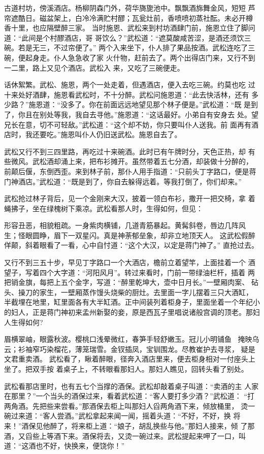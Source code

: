 古道村坊，傍溪酒店。杨柳阴森门外，荷华旖旎池中。飘飘酒旆舞金风，短短
芦帘遮酷日。磁盆架上，白冷冷满贮村醪；瓦瓮灶前，香喷喷初蒸社酝。未必开樽
香十里，也应隔壁醉三家。
当时施恩、武松来到村坊酒肆门前，施恩立住了脚问道：“此间是个村醪酒店，哥
哥饮么？”武松道：“遮莫酸咸苦涩，是酒还须饮三碗。若是无三，不过帘便了。”
两个入来坐下，仆人排了果品按酒。武松连吃了三碗，便起身走。仆人急急收了家
火什物，赶前去了。两个出得店门来，又行不到一二里，路上又见个酒店。武松入
来，又吃了三碗便走。

话休絮繁。武松、施恩，两个一处走着，但遇酒店，便入去吃三碗。约莫也吃
过十来处好酒肆，施恩看武松时，不十分醉。武松问施恩道：“此去快活林，还有
多少路？”施恩道：“没多了。你在前面远远地望见那个林子便是。”武松道：“既
是到了，你且在别处等我，我自去寻他。”施恩道：“这话最好。小弟自有安身去
处。望兄长在意，切不可轻敌。”武松道：“这个却不妨，你只要叫仆人送我。前
面再有酒店时，我还要吃。”施恩叫仆人仍旧送武松。施恩自去了。

武松又行不到三四里路，再吃过十来碗酒。此时已有午牌时分，天色正热，却
有些微风。武松酒却涌上来，把布衫摊开。虽然带着五七分酒，却装做十分醉的，
前颠后偃，东倒西歪。来到林子前，那仆人用手指道：“只前头丁字路口，便是蒋
门神酒店。”武松道：“既是到了，你自去躲得远着。等我打倒了，你们却来。”

武松抢过林子背后，见一个金刚来大汉，披着一领白布衫，撒开一把交椅，拿
着蝇拂子，坐在绿槐树下乘凉。武松看那人时，生得如何，但见：

形容丑恶，相貌粗疏。一身紫肉横铺，几道青筋暴起。黄髯斜卷，唇边几阵风
生；怪眼圆睁，眉下一双星闪。真是神荼郁垒象，却非立地顶天人。
这武松假醉佯颠，斜着眼看了一看，心中自忖道：“这个大汉，以定是蒋门神了。”
直抢过去。

又行不到三五十步，早见丁字路口一个大酒店，檐前立着望竿，上面挂着一个
酒望子，写着四个大字道：“河阳风月”。转过来看时，门前一带绿油栏杆，插着
两把销金旗，每把上五个金字，写道：“醉里乾坤大，壶中日月长。”一壁厢肉案、
砧头、操刀的家生，一壁厢蒸作馒头烧柴的厨灶。去里面一字儿摆着三只大酒缸，
半截埋在地里，缸里面各有大半缸酒。正中间装列着柜身子，里面坐着一个年纪小
的妇人，正是蒋门神初来孟州新娶的妾，原是西瓦子里唱说诸般宫调的顶老。那妇
人生得如何?

眉横翠岫，眼露秋波。樱桃口浅晕微红，春笋手轻舒嫩玉。冠儿小明铺鱼，
掩映乌云；衫袖窄巧染榴花，薄笼瑞雪。金钗插凤，宝钏围龙。尽教崔护去寻浆，
疑是文君重卖酒。
武松看了，瞅着醉眼，径奔入酒店里来，便去柜身相对一付座头上坐了。把双手按
着桌子上，不转眼看那妇人。那妇人瞧见，回转头看了别处。

武松看那店里时，也有五七个当撑的酒保。武松却敲着桌子叫道：“卖酒的主
人家在那里？”一个当头的酒保过来，看着武松道：“客人要打多少酒？”武松道：
“打两角酒。先把些来尝看。”那酒保去柜上叫那妇人舀两角酒下来，倾放桶里，
烫一碗过来道：“客人尝酒。”武松拿起来闻一闻，摇着头道：“不好，不好，换
将来！”酒保见他醉了，将来柜上道：“娘子，胡乱换些与他。”那妇人接来，倾
了那酒，又舀些上等酒下来。酒保将去，又烫一碗过来。武松提起来呷了一口，叫
道：“这酒也不好，快换来，便饶你！”

